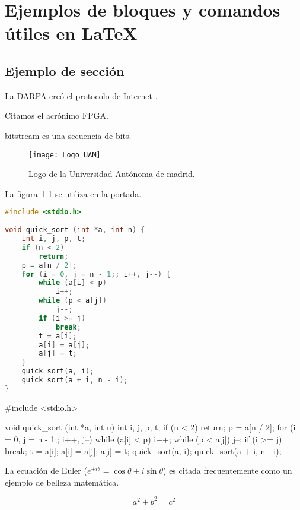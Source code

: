 \chapter{Ejemplos de bloques y comandos útiles en LaTeX\label{chap:ejemplos}}
\section{Ejemplo de sección}

%
%

La DARPA creó el protocolo de Internet \cite{ipv4sta}.

Citamos el acrónimo \gls{FPGA}.

\Gls{bitstream} es una secuencia de bits.

\begin{figure}[htp!]
  \centering
  \texttt{[image: Logo\_UAM]}
  \caption{Logo de la Universidad Autónoma de madrid.}
  \label{fig:logo_uam}
\end{figure} 

La figura~\ref{fig:logo_uam} se utiliza en la portada.

\clearpage

\begin{lstlisting}[label=algoritmo:quicksort,language=C,frame=single,caption=Algoritmo de ordenación Quicksort]
#include <stdio.h>
 
void quick_sort (int *a, int n) {
    int i, j, p, t;
    if (n < 2)
        return;
    p = a[n / 2];
    for (i = 0, j = n - 1;; i++, j--) {
        while (a[i] < p)
            i++;
        while (p < a[j])
            j--;
        if (i >= j)
            break;
        t = a[i];
        a[i] = a[j];
        a[j] = t;
    }
    quick_sort(a, i);
    quick_sort(a + i, n - i);
}
\end{lstlisting}

\begin{code}
#include <stdio.h>
 
void quick_sort (int *a, int n) {
    int i, j, p, t;
    if (n < 2)
        return;
    p = a[n / 2];
    for (i = 0, j = n - 1;; i++, j--) {
        while (a[i] < p)
            i++;
        while (p < a[j])
            j--;
        if (i >= j)
            break;
        t = a[i];
        a[i] = a[j];
        a[j] = t;
    }
    quick_sort(a, i);
    quick_sort(a + i, n - i);
}
\end{code}

La ecuación de Euler ($e^{ \pm i\theta } = \cos \theta \pm i\sin \theta$) es citada frecuentemente como un ejemplo de belleza matemática.

\begin{equation}\label{eq:pythagoras}
a^2 + b^2 = c^2
\end{equation}

